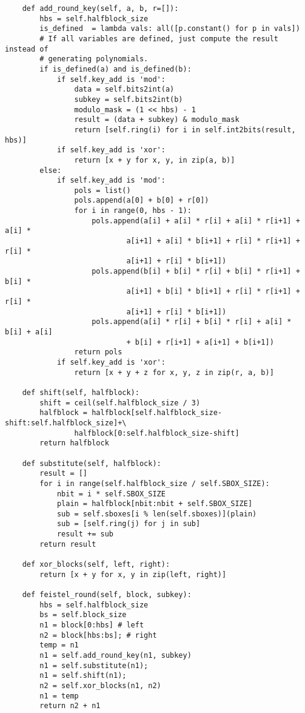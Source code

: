 \begin{lstlisting}
    def add_round_key(self, a, b, r=[]):
        hbs = self.halfblock_size
        is_defined  = lambda vals: all([p.constant() for p in vals])
        # If all variables are defined, just compute the result instead of
        # generating polynomials.
        if is_defined(a) and is_defined(b):
            if self.key_add is 'mod':
                data = self.bits2int(a)
                subkey = self.bits2int(b)
                modulo_mask = (1 << hbs) - 1
                result = (data + subkey) & modulo_mask
                return [self.ring(i) for i in self.int2bits(result, hbs)]
            if self.key_add is 'xor':
                return [x + y for x, y, in zip(a, b)]    
        else:
            if self.key_add is 'mod':
                pols = list()
                pols.append(a[0] + b[0] + r[0]) 
                for i in range(0, hbs - 1):
                    pols.append(a[i] + a[i] * r[i] + a[i] * r[i+1] + a[i] *
                            a[i+1] + a[i] * b[i+1] + r[i] * r[i+1] + r[i] *
                            a[i+1] + r[i] * b[i+1])
                    pols.append(b[i] + b[i] * r[i] + b[i] * r[i+1] + b[i] *
                            a[i+1] + b[i] * b[i+1] + r[i] * r[i+1] + r[i] *
                            a[i+1] + r[i] * b[i+1])
                    pols.append(a[i] * r[i] + b[i] * r[i] + a[i] * b[i] + a[i]
                            + b[i] + r[i+1] + a[i+1] + b[i+1])
                return pols
            if self.key_add is 'xor':
                return [x + y + z for x, y, z in zip(r, a, b)]    

    def shift(self, halfblock):
        shift = ceil(self.halfblock_size / 3)
        halfblock = halfblock[self.halfblock_size-shift:self.halfblock_size]+\ 
                halfblock[0:self.halfblock_size-shift]
        return halfblock

    def substitute(self, halfblock):
        result = []
        for i in range(self.halfblock_size / self.SBOX_SIZE):
            nbit = i * self.SBOX_SIZE
            plain = halfblock[nbit:nbit + self.SBOX_SIZE]
            sub = self.sboxes[i % len(self.sboxes)](plain)
            sub = [self.ring(j) for j in sub]
            result += sub
        return result

    def xor_blocks(self, left, right):
        return [x + y for x, y in zip(left, right)]

    def feistel_round(self, block, subkey):
        hbs = self.halfblock_size
        bs = self.block_size
        n1 = block[0:hbs] # left
        n2 = block[hbs:bs]; # right
        temp = n1
        n1 = self.add_round_key(n1, subkey)
        n1 = self.substitute(n1);
        n1 = self.shift(n1);
        n2 = self.xor_blocks(n1, n2)
        n1 = temp
        return n2 + n1


\end{lstlisting}
